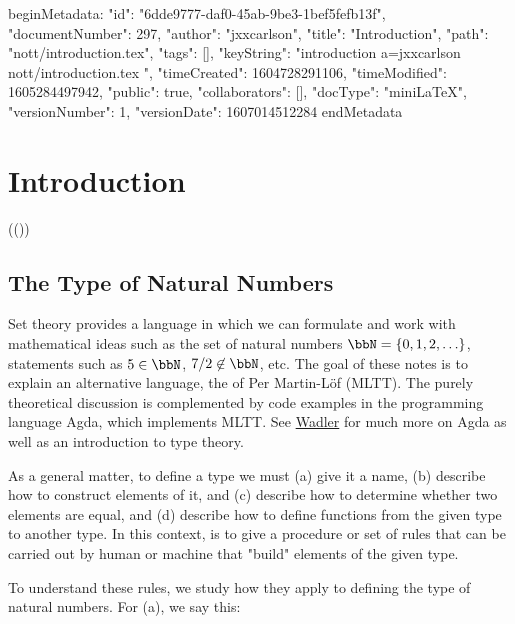 beginMetadata:
{
    "id": "6dde9777-daf0-45ab-9be3-1bef5fefb13f",
    "documentNumber": 297,
    "author": "jxxcarlson",
    "title": "Introduction",
    "path": "nott/introduction.tex",
    "tags": [],
    "keyString": "introduction a=jxxcarlson nott/introduction.tex ",
    "timeCreated": 1604728291106,
    "timeModified": 1605284497942,
    "public": true,
    "collaborators": [],
    "docType": "miniLaTeX",
    "versionNumber": 1,
    "versionDate": 1607014512284
}
endMetadata
\setcounter{section}{1}




\begin{textmacro}
\newcommand{\xcode}[1]{\blue{#1}}
\end{textmacro}

\section{Introduction}

(())

\innertableofcontents

\subsection{The Type of Natural Numbers}

Set theory provides a language in which we can formulate and work with mathematical ideas such as the set of natural numbers $\bbN = \{ 0, 1, 2, \ldots \}$, statements such as $5 \in \bbN$, $7/2 \not\in \bbN$,  etc.  The goal of these notes is to explain an alternative language, the  of Per Martin-Löf (MLTT).  The purely theoretical discussion is complemented by code examples in the programming language Agda, which implements MLTT.  See \href{https://plfa.github.io/}{Wadler} for much more on Agda as well as an introduction to type theory.

As a general matter,  to define a type we must (a) give it a name, (b) describe how to construct elements of it, and (c) describe how to determine whether two elements are equal, and (d) describe how to define functions from the given type to another type. In this context,  is to give a procedure or set of rules that can be carried out by human or machine that "build" elements of the given type.  

To understand these rules, we study how they apply to defining the type of natural numbers. For (a), we say this:

